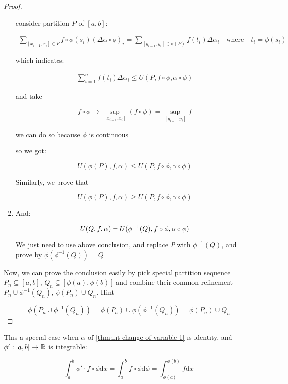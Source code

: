 \begin{proof}
\begin{enumerate}
    consider partition $P$ of $[a, b]$:


    \begin{align*}
        \sum_{[x_{i-1},x_i] \in P} f \circ \phi(s_i)  \left(\Delta \alpha \circ \phi \right)_i =\sum_{[y_{i-1},y_i] \in \phi(P)} f (t_i)  \Delta \alpha_i \quad \mathrm{where}\quad t_i = \phi(s_i)
    \end{align*}

    which indicates:

    \begin{align*}
        \sum_{i=1}^{n} f(t_i) \Delta \alpha_i \le U(P,f \circ \phi, \alpha \circ \phi)
    \end{align*}

    and take 
    
    \[
        f \circ \phi  \to \sup_{[x_{i-1},x_i]} \left(f \circ \phi \right) = \sup_{[y_{i-1},y_i]} f
    \]

    we can do so because $\phi$ is continuous

    so we got:

    \[
        U(\phi(P),f,\alpha) \le U(P,f \circ \phi,\alpha \circ \phi)
    \]


    Similarly, we prove that


    \[
        U(\phi(P),f,\alpha) \ge U(P,f \circ \phi,\alpha \circ \phi)
    \]

    \item And:
    
    \[
        U(Q, f, \alpha ) = U(\phi^{-1}(Q), f \circ \phi, \alpha \circ \phi) \\
    \]

    We just need to use above conclusion, and replace $P$ with $\phi^{-1}(Q)$, and prove by $\phi(\phi^{-1}(Q)) = Q$
    \end{enumerate}

    Now, we can prove the conclusion easily by pick special partition sequence $P_n \subseteq [a,b]$, $Q_n \subseteq [\phi(a), \phi(b)]$ and combine 
    their common refinement $P_n \cup \phi^{-1}(Q_n), \: \phi(P_n) \cup Q_n$. Hint:

    \[
        \phi(P_n \cup \phi^{-1}(Q_n)) = \phi(P_n) \cup \phi (\phi^{-1}(Q_n)) = \phi(P_n) \cup Q_n
    \]

\end{proof}


\begin{corollary}
    This a special case when $\alpha$ of \autoref{thm:int-change-of-variable-1} is identity,
    and $\phi': [a,b] \to \mathbb{R}$ is integrable:

    \[
        \int_a^b \phi' \cdot f \circ \phi \mathrm{d} x = \int_a^b  f \circ \phi \mathrm{d} \phi =  \int_{\phi(a)}^{\phi(b)}  f \mathrm{d} x
    \]

\end{corollary}

